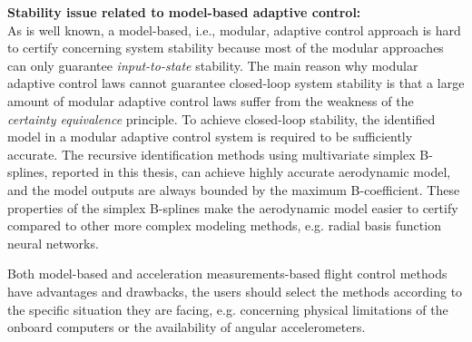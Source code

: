 \vspace{-0.4cm}
\noindent \textbf{Stability issue related to model-based adaptive control:}\\ As is well known, a model-based, i.e., modular, adaptive control approach is hard to certify concerning system stability because most of the modular approaches can only guarantee \textit{input-to-state} stability. The main reason why modular adaptive control laws cannot guarantee closed-loop system stability is that a large amount of modular adaptive control laws suffer from the weakness of the \textit{certainty equivalence} principle.
To achieve closed-loop stability, the identified model in a modular adaptive control system is required to be sufficiently accurate.
The recursive identification methods using multivariate simplex B-splines, reported in this thesis, can achieve highly accurate aerodynamic model, and the model outputs are always bounded by the maximum B-coefficient. These properties of the simplex B-splines make the aerodynamic model easier to certify compared to other more complex modeling methods, e.g. radial basis function neural networks.


Both model-based and acceleration measurements-based flight control methods have advantages and drawbacks, the users should select the methods according to the specific situation they are facing, e.g. concerning physical limitations of the onboard computers or the availability of angular accelerometers.

